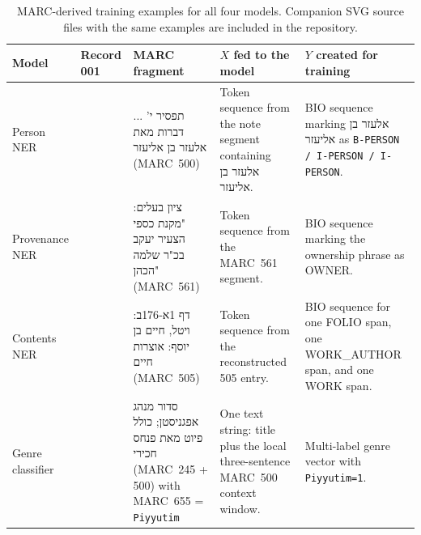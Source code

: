 \documentclass[Afour,sageh,times]{sagej}
\newcommand{\texthebrew}[1]{{\hebrewfont #1}}
\begin{document}
\begin{table}[t]
\caption{MARC-derived training examples for all four models. Companion SVG source files with the same examples are included in the repository.}
\label{tab:real-model-examples}
\centering
\footnotesize
\begin{tabularx}{\textwidth}{>{\raggedright\arraybackslash}p{2.2cm} >{\raggedright\arraybackslash}p{2.2cm} >{\raggedright\arraybackslash}X >{\raggedright\arraybackslash}X >{\raggedright\arraybackslash}X}
\toprule
\textbf{Model} & \textbf{Record 001} & \textbf{MARC fragment} & \textbf{$X$ fed to the model} & \textbf{$Y$ created for training} \\
\midrule
Person NER & 990001253330205171 & \texthebrew{... תפסיר י' דברות מאת אלעזר בן אליעזר} (MARC~500) & Token sequence from the note segment containing \texthebrew{אלעזר בן אליעזר}. & BIO sequence marking \texthebrew{אלעזר בן אליעזר} as \texttt{B-PERSON / I-PERSON / I-PERSON}. \\
\addlinespace
Provenance NER & 990001253170205171 & \texthebrew{ציון בעלים: "מקנת כספי הצעיר יעקב בכ"ר שלמה הכהן"} (MARC~561) & Token sequence from the MARC~561 segment. & BIO sequence marking the ownership phrase as OWNER. \\
\addlinespace
Contents NER & 990001253170205171 & \texthebrew{דף 1א-176ב: ויטל, חיים בן יוסף: אוצרות חיים} (MARC~505) & Token sequence from the reconstructed 505 entry. & BIO sequence for one FOLIO span, one WORK\_AUTHOR span, and one WORK span. \\
\addlinespace
Genre classifier & 990001273190205171 & \texthebrew{סדור מנהג אפגניסטן}; \texthebrew{כולל פיוט מאת פנחס חכירי} (MARC~245 + 500) with MARC~655 = \texttt{Piyyutim} & One text string: title plus the local three-sentence MARC~500 context window. & Multi-label genre vector with \texttt{Piyyutim=1}. \\
\bottomrule
\end{tabularx}
\end{table}
\end{document}
